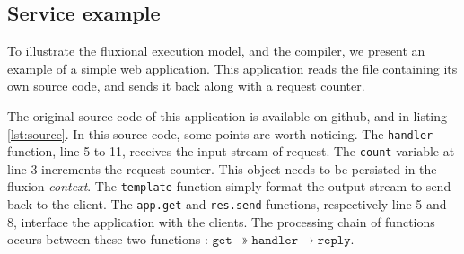 


\subsection{Service example}

To illustrate the fluxional execution model, and the compiler, we present an example of a simple web application.
This application reads the file containing its own source code, and sends it back along with a request counter.

The original source code of this application is available on github\cite{flx-example}, and in listing \ref{lst:source}.
In this source code, some points are worth noticing.
The \texttt{handler} function, line 5 to 11, receives the input stream of request.
The \texttt{count} variable at line 3 increments the request counter.
This object needs to be persisted in the fluxion \textit{context}.
The \texttt{template} function simply format the output stream to send back to the client.
The \texttt{app.get} and \texttt{res.send} functions, respectively line 5 and 8, interface the application with the clients.
The processing chain of functions occurs between these two functions : $\texttt{get} \twoheadrightarrow \texttt{handler} \to \texttt{reply}$.

